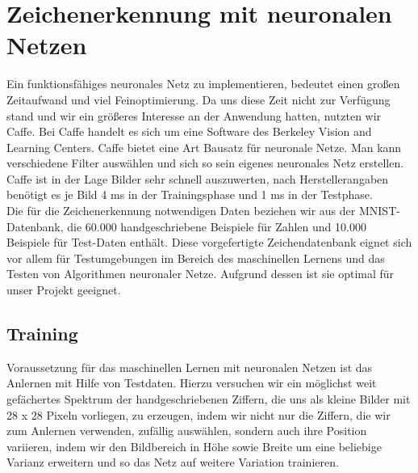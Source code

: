 \section{Zeichenerkennung mit neuronalen Netzen}

Ein funktionsfähiges neuronales Netz zu implementieren, bedeutet einen großen Zeitaufwand und viel Feinoptimierung. Da uns diese Zeit nicht zur Verfügung stand und wir ein größeres Interesse an der Anwendung hatten, nutzten wir Caffe. Bei Caffe handelt es sich um eine Software des Berkeley Vision and Learning Centers. Caffe bietet eine Art Bausatz für neuronale Netze. Man kann verschiedene Filter auswählen und sich so sein eigenes neuronales Netz erstellen. Caffe ist in der Lage Bilder sehr schnell auszuwerten, nach Herstellerangaben benötigt es je Bild 4 ms in der Trainingsphase und 1 ms in der Testphase. \\
Die für die Zeichenerkennung notwendigen Daten beziehen wir aus der MNIST-Datenbank, die 60.000 handgeschriebene Beispiele für Zahlen und 10.000 Beispiele für Test-Daten enthält. Diese vorgefertigte Zeichendatenbank eignet sich vor allem für Testumgebungen im Bereich des maschinellen Lernens und das Testen von Algorithmen neuronaler Netze. Aufgrund dessen ist sie optimal für unser Projekt geeignet.

\subsection{Training}
Voraussetzung für das maschinellen Lernen mit neuronalen Netzen ist das Anlernen mit Hilfe von Testdaten. Hierzu versuchen wir ein möglichst weit gefächertes Spektrum der handgeschriebenen Ziffern, die uns als kleine Bilder mit 28 x 28 Pixeln vorliegen, zu erzeugen, indem wir nicht nur die Ziffern, die wir zum Anlernen verwenden, zufällig auswählen, sondern auch ihre Position variieren, indem wir den Bildbereich in Höhe sowie Breite um eine beliebige Varianz erweitern und so das Netz auf weitere Variation trainieren. \\
